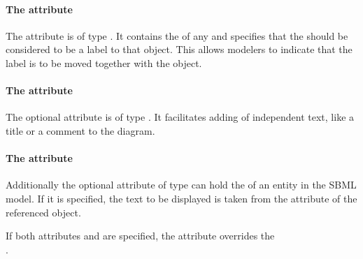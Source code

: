 \paragraph{The  attribute}
The attribute  is of type . It 
contains the  of any \GraphicalObject and specifies that the 
\TextGlyph should be considered to be a label to that object. This 
allows modelers to indicate that the label is to be moved together with the 
object. 

\paragraph{The  attribute}
The optional  attribute is of type . It 
facilitates adding of independent text, like a title or a comment to the 
diagram. 

\paragraph{The  attribute}
Additionally the optional attribute  of type 
 can hold the  of an entity in the SBML 
model. If it is specified, the text to be displayed is taken from the 
 attribute of the referenced object. 

If both attributes  and  are specified, 
the  attribute overrides the \\ . 


